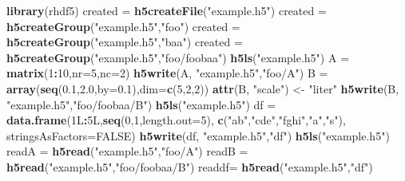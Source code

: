 \documentclass[
]{book}
\newenvironment{Shaded}{\begin{snugshade}}{\end{snugshade}}
\newcommand{\DataTypeTok}[1]{\textcolor[rgb]{0.13,0.29,0.53}{#1}}
\newcommand{\DecValTok}[1]{\textcolor[rgb]{0.00,0.00,0.81}{#1}}
\newcommand{\FloatTok}[1]{\textcolor[rgb]{0.00,0.00,0.81}{#1}}
\newcommand{\KeywordTok}[1]{\textcolor[rgb]{0.13,0.29,0.53}{\textbf{#1}}}
\newcommand{\NormalTok}[1]{#1}
\newcommand{\OperatorTok}[1]{\textcolor[rgb]{0.81,0.36,0.00}{\textbf{#1}}}
\newcommand{\OtherTok}[1]{\textcolor[rgb]{0.56,0.35,0.01}{#1}}
\newcommand{\StringTok}[1]{\textcolor[rgb]{0.31,0.60,0.02}{#1}}
\begin{document}
\begin{Shaded}
\begin{Highlighting}[]
\KeywordTok{library}\NormalTok{(rhdf5)}
\NormalTok{created =}\StringTok{ }\KeywordTok{h5createFile}\NormalTok{(}\StringTok{"example.h5"}\NormalTok{)}
\NormalTok{created =}\StringTok{ }\KeywordTok{h5createGroup}\NormalTok{(}\StringTok{"example.h5"}\NormalTok{,}\StringTok{"foo"}\NormalTok{)}
\NormalTok{created =}\StringTok{ }\KeywordTok{h5createGroup}\NormalTok{(}\StringTok{"example.h5"}\NormalTok{,}\StringTok{"baa"}\NormalTok{)}
\NormalTok{created =}\StringTok{ }\KeywordTok{h5createGroup}\NormalTok{(}\StringTok{"example.h5"}\NormalTok{,}\StringTok{"foo/foobaa"}\NormalTok{)}
\KeywordTok{h5ls}\NormalTok{(}\StringTok{"example.h5"}\NormalTok{)}
\NormalTok{A =}\StringTok{ }\KeywordTok{matrix}\NormalTok{(}\DecValTok{1}\OperatorTok{:}\DecValTok{10}\NormalTok{,}\DataTypeTok{nr=}\DecValTok{5}\NormalTok{,}\DataTypeTok{nc=}\DecValTok{2}\NormalTok{)}
\KeywordTok{h5write}\NormalTok{(A, }\StringTok{"example.h5"}\NormalTok{,}\StringTok{"foo/A"}\NormalTok{)}
\NormalTok{B =}\StringTok{ }\KeywordTok{array}\NormalTok{(}\KeywordTok{seq}\NormalTok{(}\FloatTok{0.1}\NormalTok{,}\FloatTok{2.0}\NormalTok{,}\DataTypeTok{by=}\FloatTok{0.1}\NormalTok{),}\DataTypeTok{dim=}\KeywordTok{c}\NormalTok{(}\DecValTok{5}\NormalTok{,}\DecValTok{2}\NormalTok{,}\DecValTok{2}\NormalTok{))}
\KeywordTok{attr}\NormalTok{(B, }\StringTok{"scale"}\NormalTok{) <-}\StringTok{ "liter"}
\KeywordTok{h5write}\NormalTok{(B, }\StringTok{"example.h5"}\NormalTok{,}\StringTok{"foo/foobaa/B"}\NormalTok{)}
\KeywordTok{h5ls}\NormalTok{(}\StringTok{"example.h5"}\NormalTok{)}
\NormalTok{df =}\StringTok{ }\KeywordTok{data.frame}\NormalTok{(1L}\OperatorTok{:}\NormalTok{5L,}\KeywordTok{seq}\NormalTok{(}\DecValTok{0}\NormalTok{,}\DecValTok{1}\NormalTok{,}\DataTypeTok{length.out=}\DecValTok{5}\NormalTok{),}
  \KeywordTok{c}\NormalTok{(}\StringTok{"ab"}\NormalTok{,}\StringTok{"cde"}\NormalTok{,}\StringTok{"fghi"}\NormalTok{,}\StringTok{"a"}\NormalTok{,}\StringTok{"s"}\NormalTok{), }\DataTypeTok{stringsAsFactors=}\OtherTok{FALSE}\NormalTok{)}
\KeywordTok{h5write}\NormalTok{(df, }\StringTok{"example.h5"}\NormalTok{,}\StringTok{"df"}\NormalTok{)}
\KeywordTok{h5ls}\NormalTok{(}\StringTok{"example.h5"}\NormalTok{)}
\NormalTok{readA =}\StringTok{ }\KeywordTok{h5read}\NormalTok{(}\StringTok{"example.h5"}\NormalTok{,}\StringTok{"foo/A"}\NormalTok{)}
\NormalTok{readB =}\StringTok{ }\KeywordTok{h5read}\NormalTok{(}\StringTok{"example.h5"}\NormalTok{,}\StringTok{"foo/foobaa/B"}\NormalTok{)}
\NormalTok{readdf=}\StringTok{ }\KeywordTok{h5read}\NormalTok{(}\StringTok{"example.h5"}\NormalTok{,}\StringTok{"df"}\NormalTok{)}
\end{Highlighting}
\end{Shaded}
\end{document}
